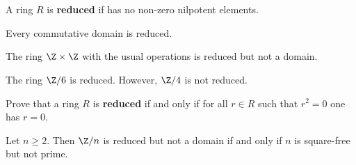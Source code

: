 \chapter{}
\label{09}



\begin{definition}
     A ring $R$ is \textbf{reduced} if 
     has no non-zero nilpotent elements. 
\end{definition}

Every commutative domain is reduced. 

\begin{example}
    The ring $\Z\times\Z$ with the usual operations 
    is reduced but not a domain. 
\end{example}

\begin{example}
    The ring $\Z/6$ is reduced. However, $\Z/4$ is not reduced. 
\end{example}

\begin{exercise}
\label{xca:reduced}
    Prove that a ring $R$ is \textbf{reduced} if and only 
    if for all $r\in R$ such that $r^2=0$ one has $r=0$.
\end{exercise}

\begin{exercise}
\label{xca:reduced_Zn}
    Let $n\geq2$. Then $\Z/n$ is reduced 
    but not a domain if and only if $n$ is square-free 
    but not prime.
\end{exercise}


